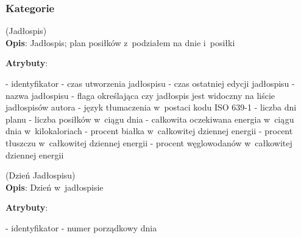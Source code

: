 \subsubsection{Kategorie}\label{subsubsec:database:mealplans:categories}
\begin{enumerate}[label={\textbf{KAT/3/\protect\twodigits{\theenumi}}}, wide, labelwidth=!, labelindent=0pt, labelsep=0pt, series=reqs]
    \setlength\itemsep{1.75em}
    \label{kat:MealPlan} (Jadłospis)\\
    \indent\textbf{Opis}: Jadłospis; plan posiłków z~podziałem na dnie i~posiłki
    \par
    \textbf{Atrybuty}:
    \begin{itemize}[series=atr, wide, align=left, leftmargin=190pt]
        \label{kat:MealPlan:id}- identyfikator
        \label{kat:MealPlan:creationTimestamp}- czas utworzenia jadłospisu
        \label{kat:MealPlan:editTimestamp}- czas ostatniej edycji jadłospisu
        \label{kat:MealPlan:name}- nazwa jadłospisu
        \label{kat:MealPlan:isVisible}- flaga określająca czy jadłospis jest widoczny na liście jadłospisów autora
        \label{kat:MealPlan:language}- język tłumaczenia w~postaci kodu ISO 639-1
        \label{kat:MealPlan:numberOfDays}- liczba dni planu
        \label{kat:MealPlan:numberOfMealsPerDay}- liczba posiłków w~ciągu dnia
        \label{kat:MealPlan:totalDailyEnergy}- całkowita oczekiwana energia w~ciągu dnia w~kilokaloriach
        \label{kat:MealPlan:percentOfProtein}- procent białka w~całkowitej dziennej energii
        \label{kat:MealPlan:percentOfFat}- procent tłuszczu w~całkowitej dziennej energii
        \label{kat:MealPlan:percentOfCarbohydrates}- procent węglowodanów w~całkowitej dziennej energii
    \end{itemize}

    \label{kat:MealPlanDay} (Dzień Jadłospisu)\\
    \indent\textbf{Opis}: Dzień w~jadłospisie
    \par
    \textbf{Atrybuty}:
    \begin{itemize}[series=atr, wide, align=left, leftmargin=190pt]
        \label{kat:MealPlanDay:id}- identyfikator
        \label{kat:MealPlanDay:ordinalNumber}- numer porządkowy dnia
    \end{itemize}


\end{enumerate}
